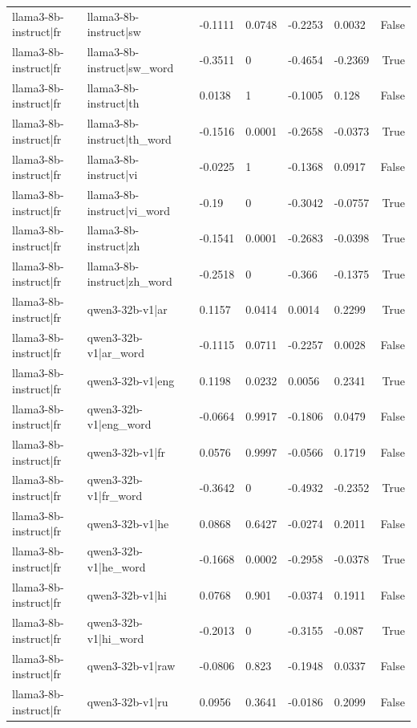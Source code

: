 \begin{table}
\begin{tabular}{llllllr}
llama3-8b-instruct|fr & llama3-8b-instruct|sw & -0.1111 & 0.0748 & -0.2253 & 0.0032 & False \\
llama3-8b-instruct|fr & llama3-8b-instruct|sw_word & -0.3511 & 0 & -0.4654 & -0.2369 & True \\
llama3-8b-instruct|fr & llama3-8b-instruct|th & 0.0138 & 1 & -0.1005 & 0.128 & False \\
llama3-8b-instruct|fr & llama3-8b-instruct|th_word & -0.1516 & 0.0001 & -0.2658 & -0.0373 & True \\
llama3-8b-instruct|fr & llama3-8b-instruct|vi & -0.0225 & 1 & -0.1368 & 0.0917 & False \\
llama3-8b-instruct|fr & llama3-8b-instruct|vi_word & -0.19 & 0 & -0.3042 & -0.0757 & True \\
llama3-8b-instruct|fr & llama3-8b-instruct|zh & -0.1541 & 0.0001 & -0.2683 & -0.0398 & True \\
llama3-8b-instruct|fr & llama3-8b-instruct|zh_word & -0.2518 & 0 & -0.366 & -0.1375 & True \\
llama3-8b-instruct|fr & qwen3-32b-v1|ar & 0.1157 & 0.0414 & 0.0014 & 0.2299 & True \\
llama3-8b-instruct|fr & qwen3-32b-v1|ar_word & -0.1115 & 0.0711 & -0.2257 & 0.0028 & False \\
llama3-8b-instruct|fr & qwen3-32b-v1|eng & 0.1198 & 0.0232 & 0.0056 & 0.2341 & True \\
llama3-8b-instruct|fr & qwen3-32b-v1|eng_word & -0.0664 & 0.9917 & -0.1806 & 0.0479 & False \\
llama3-8b-instruct|fr & qwen3-32b-v1|fr & 0.0576 & 0.9997 & -0.0566 & 0.1719 & False \\
llama3-8b-instruct|fr & qwen3-32b-v1|fr_word & -0.3642 & 0 & -0.4932 & -0.2352 & True \\
llama3-8b-instruct|fr & qwen3-32b-v1|he & 0.0868 & 0.6427 & -0.0274 & 0.2011 & False \\
llama3-8b-instruct|fr & qwen3-32b-v1|he_word & -0.1668 & 0.0002 & -0.2958 & -0.0378 & True \\
llama3-8b-instruct|fr & qwen3-32b-v1|hi & 0.0768 & 0.901 & -0.0374 & 0.1911 & False \\
llama3-8b-instruct|fr & qwen3-32b-v1|hi_word & -0.2013 & 0 & -0.3155 & -0.087 & True \\
llama3-8b-instruct|fr & qwen3-32b-v1|raw & -0.0806 & 0.823 & -0.1948 & 0.0337 & False \\
llama3-8b-instruct|fr & qwen3-32b-v1|ru & 0.0956 & 0.3641 & -0.0186 & 0.2099 & False \\

\end{tabular}
\end{table}
